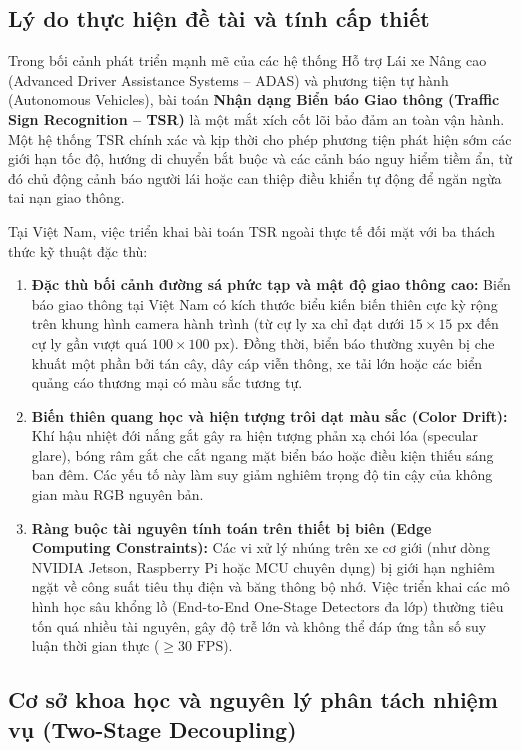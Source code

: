 \documentclass[a4paper, 11pt]{article}
\begin{document}
\subsection{Lý do thực hiện đề tài và tính cấp thiết}
\label{subsec:cap_thiet}

Trong bối cảnh phát triển mạnh mẽ của các hệ thống Hỗ trợ Lái xe Nâng cao (Advanced Driver Assistance Systems -- ADAS) và phương tiện tự hành (Autonomous Vehicles), bài toán \textbf{Nhận dạng Biển báo Giao thông (Traffic Sign Recognition -- TSR)} là một mắt xích cốt lõi bảo đảm an toàn vận hành. Một hệ thống TSR chính xác và kịp thời cho phép phương tiện phát hiện sớm các giới hạn tốc độ, hướng di chuyển bắt buộc và các cảnh báo nguy hiểm tiềm ẩn, từ đó chủ động cảnh báo người lái hoặc can thiệp điều khiển tự động để ngăn ngừa tai nạn giao thông.

Tại Việt Nam, việc triển khai bài toán TSR ngoài thực tế đối mặt với ba thách thức kỹ thuật đặc thù:

\begin{enumerate}
    \item \textbf{Đặc thù bối cảnh đường sá phức tạp và mật độ giao thông cao:} Biển báo giao thông tại Việt Nam có kích thước biểu kiến biến thiên cực kỳ rộng trên khung hình camera hành trình (từ cự ly xa chỉ đạt dưới $15 \times 15\text{ px}$ đến cự ly gần vượt quá $100 \times 100\text{ px}$). Đồng thời, biển báo thường xuyên bị che khuất một phần bởi tán cây, dây cáp viễn thông, xe tải lớn hoặc các biển quảng cáo thương mại có màu sắc tương tự.
    \item \textbf{Biến thiên quang học và hiện tượng trôi dạt màu sắc (Color Drift):} Khí hậu nhiệt đới nắng gắt gây ra hiện tượng phản xạ chói lóa (specular glare), bóng râm gắt che cắt ngang mặt biển báo hoặc điều kiện thiếu sáng ban đêm. Các yếu tố này làm suy giảm nghiêm trọng độ tin cậy của không gian màu RGB nguyên bản.
    \item \textbf{Ràng buộc tài nguyên tính toán trên thiết bị biên (Edge Computing Constraints):} Các vi xử lý nhúng trên xe cơ giới (như dòng NVIDIA Jetson, Raspberry Pi hoặc MCU chuyên dụng) bị giới hạn nghiêm ngặt về công suất tiêu thụ điện và băng thông bộ nhớ. Việc triển khai các mô hình học sâu khổng lồ (End-to-End One-Stage Detectors đa lớp) thường tiêu tốn quá nhiều tài nguyên, gây độ trễ lớn và không thể đáp ứng tần số suy luận thời gian thực ($\ge 30\text{ FPS}$).
\end{enumerate}

\subsection{Cơ sở khoa học và nguyên lý phân tách nhiệm vụ (Two-Stage Decoupling)}
\label{subsec:co_so_khoa_hoc}
\end{document}
